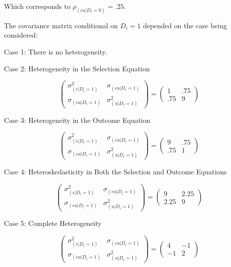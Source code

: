 \documentclass{article}
\begin{document}
Which corresponds to $\rho_{(\epsilon u|D_i=0)}=.25$.

The covariance matrix conditional on $D_i=1$ depended on the case being considered:

Case 1: There is no heterogeneity.

Case 2: Heterogeneity in the Selection Equation

\[\left( \begin{array}{cc}
\sigma_{(\epsilon|D_i=1)}^2 & \sigma_{(\epsilon u|D_i=1)} \\
\sigma_{(\epsilon u|D_i=1)} & \sigma_{(u|D_i=1)}^2  \end{array} \right) 
=
\left( \begin{array}{cc}
1 & .75 \\
.75 & 9  \end{array} \right)\] 

Case 3: Heterogeneity in the Outcome Equation

\[\left( \begin{array}{cc}
\sigma_{(\epsilon|D_i=1)}^2 & \sigma_{(\epsilon u|D_i=1)} \\
\sigma_{(\epsilon u|D_i=1)} & \sigma_{(u|D_i=1)}^2  \end{array} \right) 
=
\left( \begin{array}{cc}
9 & .75 \\
.75 & 1  \end{array} \right)\] 

Case 4: Heteroskedasticity in Both the Selection and Outcome Equations

\[\left( \begin{array}{cc}
\sigma_{(\epsilon|D_i=1)}^2 & \sigma_{(\epsilon u|D_i=1)} \\
\sigma_{(\epsilon u|D_i=1)} & \sigma_{(u|D_i=1)}^2  \end{array} \right) 
=
\left( \begin{array}{cc}
9 & 2.25 \\
2.25 & 9  \end{array} \right)\]

Case 5: Complete Heterogeneity

\[\left( \begin{array}{cc}
\sigma_{(\epsilon|D_i=1)}^2 & \sigma_{(\epsilon u|D_i=1)} \\
\sigma_{(\epsilon u|D_i=1)} & \sigma_{(u|D_i=1)}^2  \end{array} \right) 
=
\left( \begin{array}{cc}
4 & -1 \\
-1 & 2  \end{array} \right)\]
\end{document}
